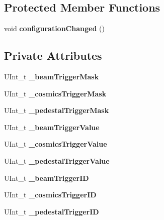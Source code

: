 \subsection*{Protected Member Functions}
\begin{DoxyCompactItemize}
\item 
void {\bfseries configuration\-Changed} ()\label{classCALICE_1_1SimpleTriggerConfiguration_ad673a5a76ff0470f8eafe32966fb458c}

\end{DoxyCompactItemize}
\subsection*{Private Attributes}
\begin{DoxyCompactItemize}
\item 
U\-Int\-\_\-t {\bfseries \-\_\-beam\-Trigger\-Mask}\label{classCALICE_1_1SimpleTriggerConfiguration_a4f370d097b812175b35ffe93c24f28e5}

\item 
U\-Int\-\_\-t {\bfseries \-\_\-cosmics\-Trigger\-Mask}\label{classCALICE_1_1SimpleTriggerConfiguration_a2764c219750efcaa915eea0bb3caa202}

\item 
U\-Int\-\_\-t {\bfseries \-\_\-pedestal\-Trigger\-Mask}\label{classCALICE_1_1SimpleTriggerConfiguration_a849801e47b4836ea21fff1d1641729fc}

\item 
U\-Int\-\_\-t {\bfseries \-\_\-beam\-Trigger\-Value}\label{classCALICE_1_1SimpleTriggerConfiguration_ab35e7ca6bb5fa8015ca95edbebccd7f4}

\item 
U\-Int\-\_\-t {\bfseries \-\_\-cosmics\-Trigger\-Value}\label{classCALICE_1_1SimpleTriggerConfiguration_a000314437dd78ab5b30eaf4e000d1f9a}

\item 
U\-Int\-\_\-t {\bfseries \-\_\-pedestal\-Trigger\-Value}\label{classCALICE_1_1SimpleTriggerConfiguration_a8c1f4b927fba0900d7d1fb7b1f0b6f93}

\item 
U\-Int\-\_\-t {\bfseries \-\_\-beam\-Trigger\-I\-D}\label{classCALICE_1_1SimpleTriggerConfiguration_ab9f06639c466d303176f753fcf558861}

\item 
U\-Int\-\_\-t {\bfseries \-\_\-cosmics\-Trigger\-I\-D}\label{classCALICE_1_1SimpleTriggerConfiguration_a388c635ca49d3de1a65e3ac9682bcd4c}

\item 
U\-Int\-\_\-t {\bfseries \-\_\-pedestal\-Trigger\-I\-D}\label{classCALICE_1_1SimpleTriggerConfiguration_a9451a02ca550fb7588b7cfebc76fda2b}

\end{DoxyCompactItemize}


